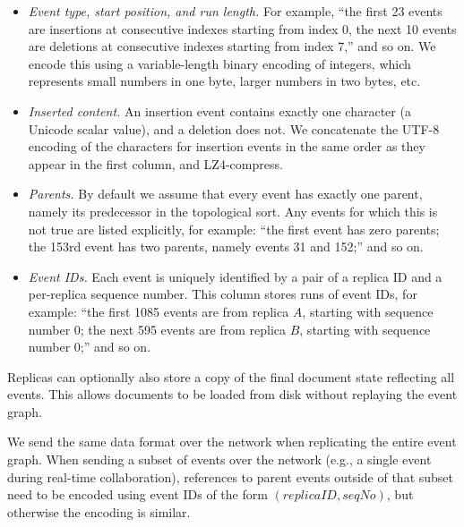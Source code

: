 \documentclass[sigplan,10pt]{acmart}
\begin{document}
\begin{itemize}
\item \emph{Event type, start position, and run length.} For example, ``the first 23 events are insertions at consecutive indexes starting from index 0, the next 10 events are deletions at consecutive indexes starting from index 7,'' and so on. We encode this using a variable-length binary encoding of integers, which represents small numbers in one byte, larger numbers in two bytes, etc.
\item \emph{Inserted content.} An insertion event contains exactly one character (a Unicode scalar value), and a deletion does not. We concatenate the UTF-8 encoding of the characters for insertion events in the same order as they appear in the first column, and LZ4-compress.
\item \emph{Parents.} By default we assume that every event has exactly one parent, namely its predecessor in the topological sort. Any events for which this is not true are listed explicitly, for example: ``the first event has zero parents; the 153rd event has two parents, namely events 31 and 152;'' and so on.
\item \emph{Event IDs.} Each event is uniquely identified by a pair of a replica ID and a per-replica sequence number. This column stores runs of event IDs, for example: ``the first 1085 events are from replica $A$, starting with sequence number 0; the next 595 events are from replica $B$, starting with sequence number 0;'' and so on.
\end{itemize}


Replicas can optionally also store a copy of the final document state reflecting all events. This allows documents to be loaded from disk without replaying the event graph.

We send the same data format over the network when replicating the entire event graph.
When sending a subset of events over the network (e.g., a single event during real-time collaboration), references to parent events outside of that subset need to be encoded using event IDs of the form $(\mathit{replicaID}, \mathit{seqNo})$, but otherwise the encoding is similar.
\end{document}
